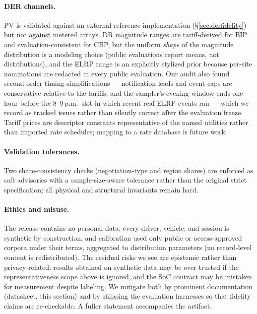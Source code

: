 \paragraph{DER channels.}
PV is validated against an external reference implementation
(\S\ref{sec:derfidelity}) but not against metered arrays. DR magnitude
ranges are tariff-derived for BIP and evaluation-consistent for CBP, but the
uniform \emph{shape} of the magnitude distribution is a modeling choice
(public evaluations report means, not distributions), and the ELRP range is
an explicitly stylized prior because per-site nominations are redacted in
every public evaluation. Our audit also found second-order timing
simplifications --- notification leads and event caps are conservative
relative to the tariffs, and the sampler's evening window ends one hour
before the 8--9\,p.m.\ slot in which recent real ELRP events ran --- which
we record as tracked issues rather than silently correct after the
evaluation freeze. Tariff prices are descriptor constants representative of
the named utilities rather than imported rate schedules; mapping to a rate
database is future work.

\paragraph{Validation tolerances.}
Two share-consistency checks (negotiation-type and region shares) are
enforced as soft advisories with a sample-size-aware tolerance rather than
the original strict specification; all physical and structural invariants
remain hard.

\paragraph{Ethics and misuse.}
The release contains no personal data: every driver, vehicle, and session is
synthetic by construction, and calibration used only public or
access-approved corpora under their terms, aggregated to distribution
parameters (no record-level content is redistributed). The residual risks we
see are epistemic rather than privacy-related: results obtained on synthetic
data may be over-trusted if the representativeness scope above is ignored,
and the SoC contract may be mistaken for measurement despite labeling. We
mitigate both by prominent documentation (datasheet, this section) and by
shipping the evaluation harnesses so that fidelity claims are re-checkable.
A fuller statement accompanies the artifact.
